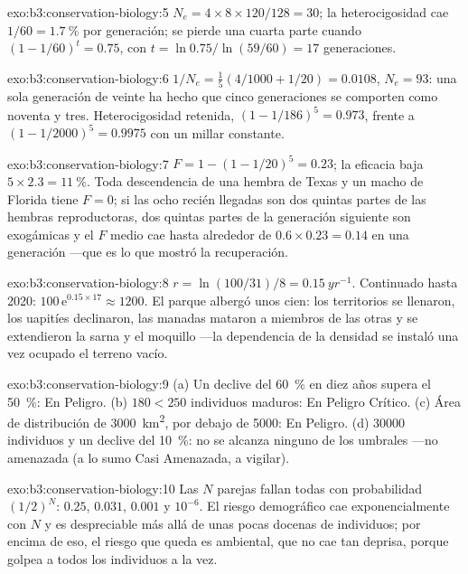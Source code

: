 \begin{solution}{exo:b3:conservation-biology:5}
$N_{e} = 4\times 8\times 120/128 = 30$; la heterocigosidad cae $1/60 =
\qty{1.7}{\%}$ por generación; se pierde una cuarta parte cuando $(1 - 1/60)^{t} =
0.75$, con $t = \ln 0.75/\ln(59/60) = 17$ generaciones.
\end{solution}

\begin{solution}{exo:b3:conservation-biology:6}
$1/N_{e} = \tfrac{1}{5}(4/1000 + 1/20) = 0.0108$, $N_{e} = 93$: una sola
generación de veinte ha hecho que cinco generaciones se comporten como
noventa y tres. Heterocigosidad retenida, $(1 - 1/186)^{5} = 0.973$,
frente a $(1 -
1/2000)^{5} = 0.9975$ con un millar constante.
\end{solution}

\begin{solution}{exo:b3:conservation-biology:7}
$F = 1 - (1 - 1/20)^{5} = 0.23$; la eficacia baja
$5\times 2.3 = \qty{11}{\%}$. Toda descendencia de una hembra de Texas y
un macho de Florida tiene $F = 0$; si las ocho recién llegadas son dos
quintas partes de las hembras reproductoras, dos quintas partes de la
generación siguiente son exogámicas y el $F$ medio cae hasta alrededor
de $0.6\times 0.23 = 0.14$ en una generación ---que es lo que mostró la
recuperación.
\end{solution}

\begin{solution}{exo:b3:conservation-biology:8}
$r = \ln(100/31)/8 = \qty{0.15}{yr^{-1}}$. Continuado hasta 2020:
$100\,\mathrm{e}^{0.15\times 17} \approx 1200$. El parque albergó unos
cien: los territorios se llenaron, los uapitíes declinaron, las manadas
mataron a miembros de las otras y se extendieron la sarna y el moquillo
---la dependencia de la densidad se instaló una vez ocupado el terreno
vacío.
\end{solution}

\begin{solution}{exo:b3:conservation-biology:9}
(a) Un declive del \qty{60}{\%} en diez años supera el \qty{50}{\%}: En
Peligro. (b) $180 < 250$ individuos maduros: En Peligro Crítico. (c)
Área de distribución de \qty{3000}{km^2}, por debajo de \qty{5000}{}: En
Peligro. (d) \num{30000} individuos y un declive del \qty{10}{\%}: no se
alcanza ninguno de los umbrales ---no amenazada (a lo sumo Casi
Amenazada, a vigilar).
\end{solution}

\begin{solution}{exo:b3:conservation-biology:10}
Las $N$ parejas fallan todas con probabilidad $(1/2)^{N}$: $0.25$,
$0.031$, $0.001$ y $10^{-6}$. El riesgo demográfico cae
exponencialmente con $N$ y es despreciable más allá de unas pocas
docenas de individuos; por encima de eso, el riesgo que queda es
ambiental, que no cae tan deprisa, porque golpea a todos los individuos
a la vez.
\end{solution}

